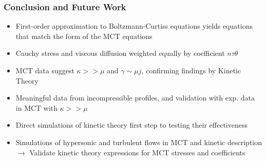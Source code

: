 \documentclass{beamer}
\begin{document}
\begin{frame}
\frametitle{Conclusion and Future Work}
\begin{itemize}
 \item First-order approximation to Boltzmann-Curtiss equations yields 
equations that match the form of the MCT equations
\pause
\item Cauchy stress and viscous diffusion weighted equally by coefficient 
$n\tau\theta$
\pause
\item MCT data suggest $\kappa >> \mu$ and $\gamma \sim \mu j$, confirming 
findings by Kinetic Theory
\pause
\item Meaningful data from incompressible profiles, and validation with exp. 
data in MCT with $\kappa >> \mu$
\pause
\item Direct simulations of kinetic theory first step to testing their 
effectiveness
\pause
\item Simulations of hypersonic and turbulent flows in MCT and kinetic 
description $\rightarrow$ Validate kinetic theory expressions for MCT stresses 
and coefficients
\end{itemize}
\end{frame}
\end{document}
